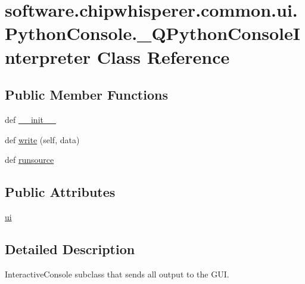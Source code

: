 \hypertarget{classsoftware_1_1chipwhisperer_1_1common_1_1ui_1_1PythonConsole_1_1__QPythonConsoleInterpreter}{}\section{software.\+chipwhisperer.\+common.\+ui.\+Python\+Console.\+\_\+\+Q\+Python\+Console\+Interpreter Class Reference}
\label{classsoftware_1_1chipwhisperer_1_1common_1_1ui_1_1PythonConsole_1_1__QPythonConsoleInterpreter}
\subsection*{Public Member Functions}
\begin{DoxyCompactItemize}
\item 
def \hyperlink{classsoftware_1_1chipwhisperer_1_1common_1_1ui_1_1PythonConsole_1_1__QPythonConsoleInterpreter_a329015af967a04594c548a5b2d712fe2}{\+\_\+\+\_\+init\+\_\+\+\_\+}
\item 
def \hyperlink{classsoftware_1_1chipwhisperer_1_1common_1_1ui_1_1PythonConsole_1_1__QPythonConsoleInterpreter_a3222ab15ce893122c0c921f45ab5e62d}{write} (self, data)
\item 
def \hyperlink{classsoftware_1_1chipwhisperer_1_1common_1_1ui_1_1PythonConsole_1_1__QPythonConsoleInterpreter_a6d98da582270adb93ca52905b20ca0b1}{runsource}
\end{DoxyCompactItemize}
\subsection*{Public Attributes}
\begin{DoxyCompactItemize}
\item 
\hyperlink{classsoftware_1_1chipwhisperer_1_1common_1_1ui_1_1PythonConsole_1_1__QPythonConsoleInterpreter_a5167337e752acb38c800ae701d58a2e7}{ui}
\end{DoxyCompactItemize}


\subsection{Detailed Description}
\begin{DoxyVerb}InteractiveConsole subclass that sends all output to the GUI.\end{DoxyVerb}
 


